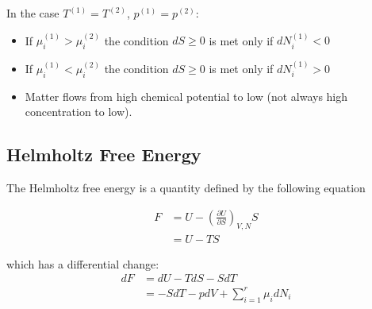 \documentclass[book.tex]{subfiles}
\begin{document}



In the case $T^{(1)}=T^{(2)}$, $p^{(1)}=p^{(2)}$:

\begin{itemize}
\item If $\mu_i^{(1)}>\mu_i^{(2)}$ the condition $dS\geq 0$ is met only if $dN_i^{(1)}<0$
\item If $\mu_i^{(1)}<\mu_i^{(2)}$ the condition $dS\geq 0$ is met only if $dN_i^{(1)}>0$
\item Matter flows from high chemical potential to low (not always high concentration to low).
\end{itemize}

\subsection{Helmholtz Free Energy}
The Helmholtz free energy is a quantity defined by the following equation

\begin{align}
F &= U-\left(\frac{\partial U}{\partial S}\right)_{V,N} S \\
&= U -TS
\end{align}

which has a differential change:
\begin{align}
dF &= dU -TdS-SdT \\
&=-SdT-pdV + \sum_{i=1}^r\mu_idN_i
\end{align}
\end{document}
